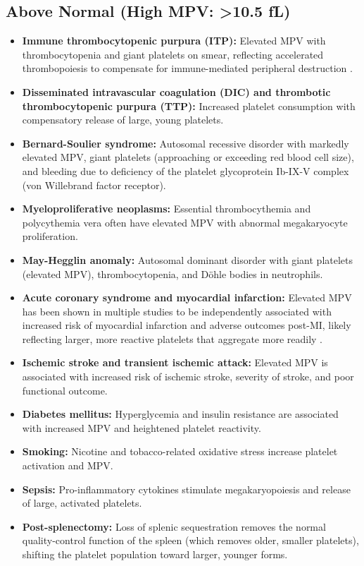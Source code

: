 \subsection*{Above Normal (High MPV: >10.5 fL)}
\begin{itemize}
  \item \textbf{Immune thrombocytopenic purpura (ITP):} Elevated MPV with thrombocytopenia and giant platelets on smear, reflecting accelerated thrombopoiesis to compensate for immune-mediated peripheral destruction \cite{kaushansky2021williams}.
  \item \textbf{Disseminated intravascular coagulation (DIC) and thrombotic thrombocytopenic purpura (TTP):} Increased platelet consumption with compensatory release of large, young platelets.
  \item \textbf{Bernard-Soulier syndrome:} Autosomal recessive disorder with markedly elevated MPV, giant platelets (approaching or exceeding red blood cell size), and bleeding due to deficiency of the platelet glycoprotein Ib-IX-V complex (von Willebrand factor receptor).
  \item \textbf{Myeloproliferative neoplasms:} Essential thrombocythemia and polycythemia vera often have elevated MPV with abnormal megakaryocyte proliferation.
  \item \textbf{May-Hegglin anomaly:} Autosomal dominant disorder with giant platelets (elevated MPV), thrombocytopenia, and D\"{o}hle bodies in neutrophils.
  \item \textbf{Acute coronary syndrome and myocardial infarction:} Elevated MPV has been shown in multiple studies to be independently associated with increased risk of myocardial infarction and adverse outcomes post-MI, likely reflecting larger, more reactive platelets that aggregate more readily \cite{chu2010mean}.
  \item \textbf{Ischemic stroke and transient ischemic attack:} Elevated MPV is associated with increased risk of ischemic stroke, severity of stroke, and poor functional outcome.
  \item \textbf{Diabetes mellitus:} Hyperglycemia and insulin resistance are associated with increased MPV and heightened platelet reactivity.
  \item \textbf{Smoking:} Nicotine and tobacco-related oxidative stress increase platelet activation and MPV.
  \item \textbf{Sepsis:} Pro-inflammatory cytokines stimulate megakaryopoiesis and release of large, activated platelets.
  \item \textbf{Post-splenectomy:} Loss of splenic sequestration removes the normal quality-control function of the spleen (which removes older, smaller platelets), shifting the platelet population toward larger, younger forms.
\end{itemize}

